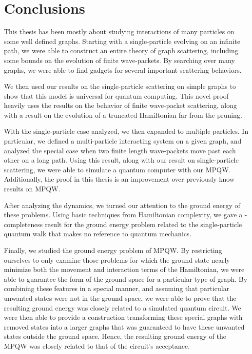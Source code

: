 \documentclass[../thesis-main/thesis-main]{subfiles}
\begin{document}
 
\chapter{Conclusions}

This thesis has been mostly about studying interactions of many particles on some well defined graphs.  Starting with a single-particle evolving on an infinite path, we were able to construct an entire theory of graph scattering, including some bounds on the evolution of finite wave-packets.  By searching over many graphs, we were able to find gadgets for several important scattering behaviors.

We then used our results on the single-particle scattering on simple graphs to show that this model is universal for quantum computing.  This novel proof heavily uses the results on the behavior of finite wave-packet scattering, along with a result on the evolution of a truncated Hamiltonian far from the pruning.


With the single-particle case analyzed, we then expanded to multiple particles.  In particular, we defined a multi-particle interacting system on a given graph, and analyzed the special case when two finite length wave-packets move past each other on a long path.  Using this result, along with our result on single-particle scattering, we were able to simulate a quantum computer with our MPQW.  Additionally, the proof in this thesis is an improvement over previously know results on MPQW.

After analyzing the dynamics, we turned our attention to the ground energy of these problems.  Using basic techniques from Hamiltonian complexity, we gave a \QMA-completeness result for the ground energy problem related to the single-particle quantum walk that makes no reference to quantum mechanics.

Finally, we studied the ground energy problem of MPQW.  By restricting ourselves to only examine those problems for which the ground state nearly minimize both the movement and interaction terms of the Hamiltonian, we were able to guarantee the form of the ground space for a particular type of graph. By combining these features in a special manner, and assuming that particular unwanted states were not in the ground space, we were able to prove that the resulting ground energy was closely related to a simulated quantum circuit.   We were then able to provide a construction transforming these special graphs with removed states into a larger graphs that was guaranteed to have these unwanted states outside the ground space.  Hence, the resulting ground energy of the MPQW was closely related to that of the circuit's acceptance.
\end{document}
